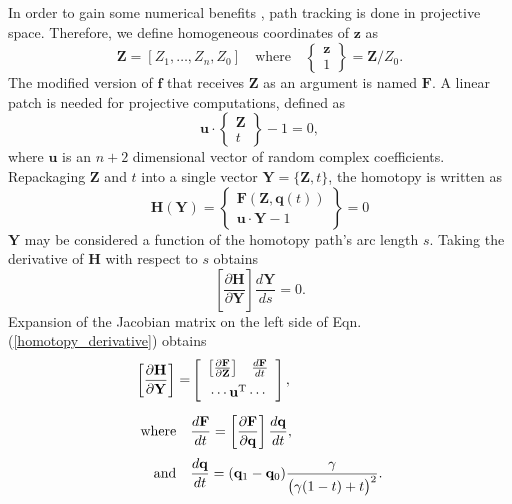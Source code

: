 \documentclass[journal]{IEEEtran}
\begin{document}
In order to gain some numerical benefits \cite{morganHomotopySolvingGeneral1987}, path tracking is done in projective space.
Therefore, we define homogeneous coordinates of $\mathbf{z}$ as
\begin{equation}
\mathbf{Z} = [ Z_1, \ldots, Z_n, Z_0 ] \quad \text{where} \quad 
\begin{Bmatrix} \mathbf{z} \\ 1 \end{Bmatrix} = \mathbf{Z}/Z_0.
\end{equation}
The modified version of $\mathbf{f}$ that receives $\mathbf{Z}$ as an argument is named $\mathbf{F}$.
A linear patch is needed for projective computations, defined as
\begin{equation}
\mathbf{u} \cdot \begin{Bmatrix} \mathbf{Z} \\ t \end{Bmatrix}  - 1 = 0,
\label{patch}
\end{equation}
where $\mathbf{u}$ is an $n+2$ dimensional vector of random complex coefficients.
Repackaging $\mathbf{Z}$ and $t$ into a single vector $\mathbf{Y} = \{ \mathbf{Z}, t \}$, the homotopy is written as
\begin{equation}
\mathbf{H}(\mathbf{Y}) = 
\begin{Bmatrix} 
\mathbf{F}(\mathbf{Z}, \mathbf{q}(t)) \\ 
\mathbf{u}\cdot\mathbf{Y} -1
\end{Bmatrix}= 0 \label{homotopy_projected}
\end{equation}
$\mathbf{Y}$ may be considered a function of the homotopy path's arc length $s$. Taking the derivative of $\mathbf{H}$ with respect to $s$ obtains
\begin{equation}
\left[ \frac{\partial \mathbf{H}}{\partial \mathbf{Y}} \right] \frac{d\mathbf{Y}}{ds} = 0. \label{homotopy_derivative}
\end{equation}
Expansion of the Jacobian matrix on the left side of Eqn. (\ref{homotopy_derivative}) obtains
\begin{align}
\left[ \frac{\partial \mathbf{H}}{\partial \mathbf{Y}} \right] = 
&\left[\begin{array}{cc}
\left[ \frac{\partial \mathbf{F}}{\partial \mathbf{Z}} \right] & 
\frac{d\mathbf{F}}{dt} \label{Jacobian_expansion}\\[2mm]
\multicolumn{2}{c}{\cdots\mathbf{u}^\text{T}\cdots}
\end{array} \right], \\[2mm]
\text{where} \quad &\frac{d\mathbf{F}}{dt} = \left[ \frac{\partial \mathbf{F}}{\partial \mathbf{q}} \right] \frac{d\mathbf{q}}{dt}, \nonumber\\[1mm]
\text{and} \quad &\frac{d\mathbf{q}}{dt} = (\mathbf{q}_1 - \mathbf{q}_0)\frac{\gamma}{\big( \gamma(1-t)+t \big)^2}. \nonumber
\end{align}
\end{document}
